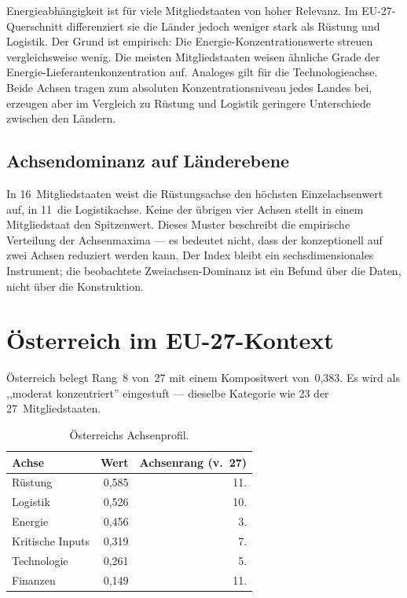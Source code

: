 \begin{sloppypar}
Energie\-abh\"angigkeit ist f\"ur viele Mitgliedstaaten von hoher
Relevanz.  Im EU-27-Querschnitt differenziert sie die L\"ander
jedoch weniger stark als R\"ustung und Logistik.  Der Grund ist
empirisch: Die Energie-Konzentrations\-werte streuen
vergleichsweise wenig.  Die meisten Mitgliedstaaten weisen
\"ahnliche Grade der Energie-Lieferanten\-konzentration auf.
Analoges gilt f\"ur die Technologie\-achse.  Beide Achsen tragen
zum absoluten Konzentrations\-niveau jedes Landes bei, erzeugen
aber im Vergleich zu R\"ustung und Logistik geringere Unterschiede
zwischen den L\"andern.
\end{sloppypar}

\subsection{Achsendominanz auf L\"anderebene}

\begin{sloppypar}
In 16~Mitgliedstaaten weist die R\"ustungsachse den h\"ochsten
Einzelachsenwert auf, in 11~die Logistik\-achse.  Keine der
\"ubrigen vier Achsen stellt in einem Mitgliedstaat den
Spitzenwert.  Dieses Muster beschreibt die empirische Verteilung
der Achsenmaxima --- es bedeutet nicht, dass der \ISI konzeptionell
auf zwei Achsen reduziert werden kann.  Der Index bleibt ein
sechs\-dimensionales Instrument; die beobachtete
Zweiachsen-Dominanz ist ein Befund \"uber die Daten, nicht \"uber
die Konstruktion.
\end{sloppypar}


\section{\"Osterreich im EU-27-Kontext}
\label{sec:oesterreich}

\"Osterreich belegt Rang~8 von~27 mit einem Kompositwert
von~0{,}383.  Es wird als ,,moderat konzentriert'' eingestuft ---
dieselbe Kategorie wie 23 der 27~Mitgliedstaaten.

\begin{table}[htbp]
\centering\small
\caption{\"Osterreichs Achsenprofil.}
\label{tab:oesterreich}
\begin{tabular}{@{}lrr@{}}
\toprule
\textbf{Achse} & \textbf{Wert} & \textbf{Achsenrang (v.\ 27)} \\
\midrule
R\"ustung          & 0{,}585 & 11. \\
Logistik           & 0{,}526 & 10. \\
Energie            & 0{,}456 &  3. \\
Kritische Inputs   & 0{,}319 &  7. \\
Technologie        & 0{,}261 &  5. \\
Finanzen           & 0{,}149 & 11. \\
\bottomrule
\end{tabular}
\end{table}

